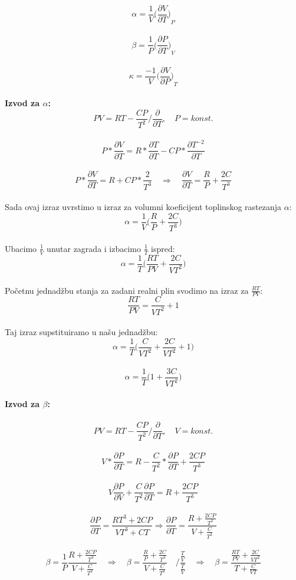 \documentclass[a4paper,12pt]{article}
\begin{document}
$$ \alpha=\frac{1}{V} {\Big( \frac{\partial V}{\partial T}  \Big)}_P $$
\\
$$ \beta=\frac{1}{P} {\Big( \frac{\partial P}{\partial T}  \Big)}_V $$
\\
$$ \kappa=\frac{-1}{V} {\Big( \frac{\partial V}{\partial P}  \Big)}_T $$
\\
\textbf{Izvod za $\alpha$:}
\\
$$ PV=RT-\frac{CP}{T^2} \Big/ \frac{\partial}{\partial T}, \quad  P=konst. $$
\\
$$ P*\frac{\partial V}{\partial T}=R* \frac{\partial T}{\partial T} - CP* \frac{\partial T^{-2}}{\partial T} $$
\\
$$ P*\frac{\partial V}{\partial T}=R+CP*\frac{2}{T^3} \quad \Rightarrow \quad \frac{\partial V}{\partial T}=\frac{R}{P}+\frac{2C}{T^3} $$
\\
Sada ovaj izraz uvrstimo u izraz za volumni koeficijent toplinskog rastezanja $\alpha$:
\\
$$ \alpha=\frac{1}{V} \Big( \frac{R}{P}+\frac{2C}{T^3} \Big) $$
\\
Ubacimo $\frac{1}{V}$ unutar zagrada i izbacimo $\frac{1}{T}$ ispred:
\\
$$ \alpha=\frac{1}{T} \Big( \frac{RT}{PV}+\frac{2C}{VT^2} \Big) $$
\\
Po\v{c}etnu jednad\v{z}bu stanja za zadani realni plin svodimo na izraz za $\frac{RT}{PV}$:
\\
$$ \frac{RT}{PV}=\frac{C}{VT^2}+1 $$
\\
Taj izraz supstituiramo u na\v{s}u jednad\v{z}bu:
\\
$$ \alpha=\frac{1}{T} \Big( \frac{C}{VT^2}+\frac{2C}{VT^2}+1 \Big)  $$
\\
$$ \alpha=\frac{1}{T} \Big( 1+\frac{3C}{VT^2} \Big)  $$
\\
\textbf{Izvod za $\beta$:} \\
\\
$$ PV=RT-\frac{CP}{T^2} \Big/ \frac{\partial}{\partial T}, \quad  V=konst. $$
\\
$$ V*\frac{\partial P}{\partial T}=R-\frac{C}{T^2}*\frac{\partial P}{\partial T}+\frac{2CP}{T^3} $$
\\
$$ V\frac{\partial P}{\partial V}+\frac{C}{T^2}\frac{\partial P}{\partial T}=R+\frac{2CP}{T^3} $$
\\
$$ \frac{\partial P}{\partial T}=\frac{RT^3+2CP}{VT^3+CT} \Rightarrow \frac{\partial P}{\partial T}=\frac{R+\frac{2CP}{T^3}}{V+\frac{C}{T^2}} $$
\\
$$ \beta=\frac{1}{P} \frac{R+\frac{2CP}{T^3}}{V+\frac{C}{T^2}} \quad \Rightarrow \quad
   \beta=\frac{\frac{R}{P}+\frac{2C}{T^3}}{V+\frac{C}{T^2}} \quad  \Big/ \frac{\frac{T}{V}}{\frac{T}{V}}
   \quad \Rightarrow \quad 
   \beta=\frac{\frac{RT}{PV}+\frac{2C}{VT^2}}{T+\frac{C}{VT}}
$$   
\end{document}
